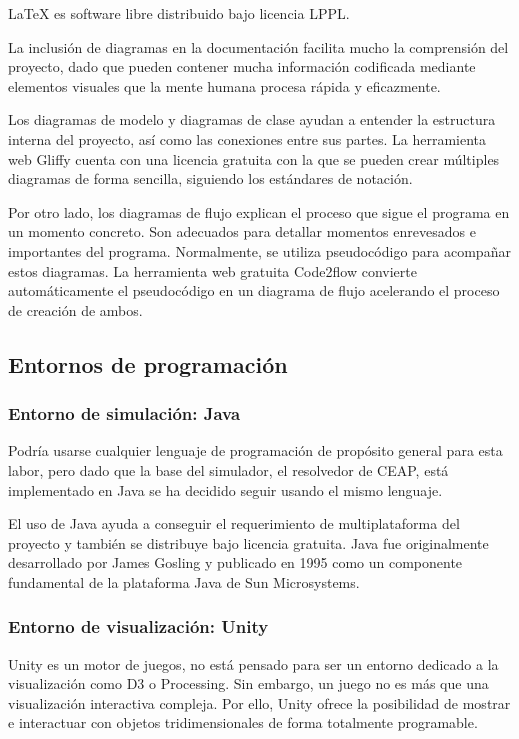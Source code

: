 \documentclass[12pt,a4paper,openright,oneside]{article}
\numberwithin{equation}{section}
\theoremstyle{definition}
\begin{document}
LaTeX es software libre distribuido bajo licencia LPPL.

La inclusión de diagramas en la documentación facilita mucho la comprensión del proyecto, dado que pueden contener mucha información codificada mediante elementos visuales que la mente humana procesa rápida y eficazmente.

Los diagramas de modelo y diagramas de clase ayudan a entender la estructura interna del proyecto, así como las conexiones entre sus partes. La herramienta web Gliffy cuenta con una licencia gratuita con la que se pueden crear múltiples diagramas de forma sencilla, siguiendo los estándares de notación.

Por otro lado, los diagramas de flujo explican el proceso que sigue el programa en un momento concreto. Son adecuados para detallar momentos enrevesados e importantes del programa. Normalmente, se utiliza pseudocódigo para acompañar estos diagramas. La herramienta web gratuita Code2flow convierte automáticamente el pseudocódigo en un diagrama de flujo acelerando el proceso de creación de ambos.

\subsection{Entornos de programación}

\subsubsection{Entorno de simulación: Java}

Podría usarse cualquier lenguaje de programación de propósito general para esta labor, pero dado que la base del simulador, el resolvedor de CEAP, está implementado en Java se ha decidido seguir usando el mismo lenguaje.

El uso de Java ayuda a conseguir el requerimiento de multiplataforma del proyecto y también se distribuye bajo licencia gratuita. Java fue originalmente desarrollado por James Gosling y publicado en 1995 como un componente fundamental de la plataforma Java de Sun Microsystems. 

\subsubsection{Entorno de visualización: Unity}

Unity es un motor de juegos, no está pensado para ser un entorno dedicado a la visualización como D3 o Processing. Sin embargo, un juego no es más que una visualización interactiva compleja. Por ello, Unity ofrece la posibilidad de mostrar e interactuar con objetos tridimensionales de forma totalmente programable. 
\end{document}
